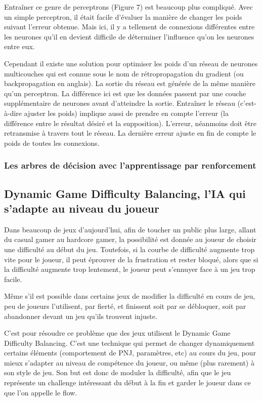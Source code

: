 \documentclass[a4paper, 12pt]{article} %
\begin{document}
Entraîner ce genre de perceptrons (Figure 7) est beaucoup plus compliqué. Avec un simple perceptron, il était facile d’évaluer la manière de changer les poids suivant l’erreur obtenue. Mais ici, il y a tellement de connexions différentes entre les neurones qu’il en devient difficile de déterminer l’influence qu’on les neurones entre eux.

Cependant il existe une solution pour optimiser les poids d’un réseau de neurones multicouches qui est connue sous le nom de rétropropagation du gradient (ou backpropagation en anglais). La sortie du réseau est générée de la même manière qu’un perceptron. La différence ici est que les données passent par une couche supplémentaire de neurones avant d’atteindre la sortie. Entraîner le réseau (c’est-à-dire ajuster les poids) implique aussi de prendre en compte l’erreur (la différence entre le résultat désiré et la supposition). L’erreur, néanmoins doit être retransmise à travers tout le réseau. La dernière erreur ajuste en fin de compte le poids de toutes les connexions.

\newpage
\subsubsection{Les arbres de décision avec l’apprentissage par renforcement}

\newpage
\subsection{Dynamic Game Difficulty Balancing, l’IA qui s’adapte au niveau du joueur}

Dans beaucoup de jeux d’aujourd’hui, afin de toucher un public plus large, allant du casual gamer au hardcore gamer, la possibilité est donnée au joueur de choisir une difficulté au début du jeu. Toutefois, si la courbe de difficulté augmente trop vite pour le joueur, il peut éprouver de la frustration et rester bloqué, alors que si la difficulté augmente trop lentement, le joueur peut s’ennuyer face à un jeu trop facile.

Même s’il est possible dans certains jeux de modifier la difficulté en cours de jeu, peu de joueurs l’utilisent, par fierté, et finissent soit par se débloquer, soit par abandonner devant un jeu qu’ils trouvent injuste.

C’est pour résoudre ce problème que des jeux utilisent le Dynamic Game Difficulty Balancing. C’est une technique qui permet de changer dynamiquement certains éléments (comportement de PNJ, paramètres, etc) au cours du jeu, pour mieux s’adapter au niveau de compétence du joueur, ou même (plus rarement) à son style de jeu. Son but est donc de moduler la difficulté, afin que le jeu représente un challenge intéressant du début à la fin et garder le joueur dans ce que l'on appelle le flow.
\end{document}
